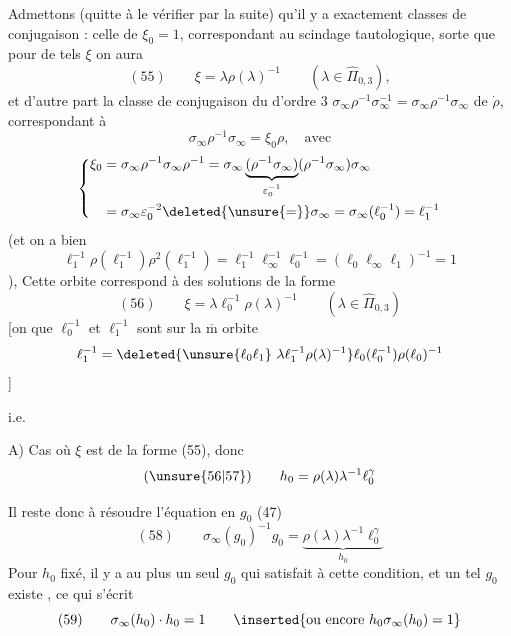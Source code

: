 
Admettons (quitte à le vérifier par la suite) qu'il y a exactement  classes de conjugaison : celle de $\xi_0=1$, correspondant au scindage tautologique,  sorte que pour de tels $\xi$ on aura
\[
(55)\qquad \xi=\lambda\rho(\lambda)^{-1}
\qquad(\lambda\in\widehat{\Pi}_{0,3}),
\]
et d'autre part la classe de conjugaison du  d'ordre 3 $\sigma_\infty\rho^{-1}\sigma_\infty^{-1}=\sigma_\infty\rho^{-1}\sigma_\infty$ de $\dot\rho$, correspondant à
\[
\sigma_\infty\rho^{-1}\sigma_\infty=\xi_0\rho,\quad\text{avec}
\]
\[
\left\{\begin{aligned}
\xi_0&=\sigma_\infty\rho^{-1}\sigma_\infty\rho^{-1}
=\sigma_\infty\underbrace{(\rho^{-1}\sigma_\infty)}_{\varepsilon_0^{-1}}(\rho^{-1}\sigma_\infty)\sigma_\infty\\
&=\sigma_\infty\varepsilon_0^{-2}\deleted{\unsure{=}}\sigma_\infty
=\sigma_\infty(\ell_0^{-1})=\ell_1^{-1}
\end{aligned}\right.
\]
(et on a bien
\[
\ell_1^{-1}\rho(\ell_1^{-1})\rho^2(\ell_1^{-1})
=\ell_1^{-1}\ell_\infty^{-1}\ell_0^{-1}
=(\ell_0\ell_\infty\ell_1)^{-1}=1
\]
), Cette orbite correspond à des solutions de la forme 
\[
(56)\qquad \xi=\lambda\ell_0^{-1}\rho(\lambda)^{-1}
\qquad(\lambda\in\widehat{\Pi}_{0,3})
\]
[on  que $\ell_0^{-1}$ et $\ell_1^{-1}$ sont sur la $\overline{\mathrm m}$ orbite
\[
\ell_1^{-1}=\deleted{\unsure{\ell_0\ell_1}\ \lambda\ell_1^{-1}\rho(\lambda)^{-1}}
\ell_0(\ell_0^{-1})\rho(\ell_0)^{-1}
\]
]

i.e. 


A) Cas  où $\xi$ est de la forme (55), donc
\[
(\unsure{56|57})\qquad h_0=\rho(\lambda)\lambda^{-1}\ell_0^\gamma
\]


Il reste donc à résoudre l'équation en $g_0$ (47)
\[
(58)\qquad
\sigma_\infty(g_0)^{-1}g_0
=\underbrace{\rho(\lambda)\lambda^{-1}\ell_0^\gamma}_{h_0}
\]
Pour  $h_0$ fixé, il y a au plus un seul $g_0$ qui satisfait à cette condition, et un tel $g_0$ existe  , ce qui s'écrit
\[
(59)\qquad \sigma_\infty(h_0)\cdot h_0=1
\qquad\inserted{\text{ou encore }h_0\sigma_\infty(h_0)=1}
\]

